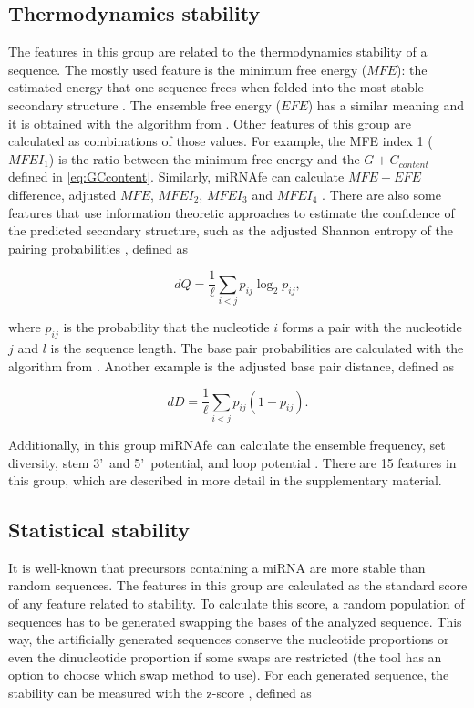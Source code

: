 \documentclass{article}
\begin{document}
\subsection{Thermodynamics stability}
The features in this group are related to the thermodynamics stability of a sequence. The mostly used feature is the minimum free energy ($MFE$): the estimated 
energy that one sequence frees when folded into the most stable secondary structure \citep{Zuker81}. The ensemble free energy ($EFE$) has a similar meaning and 
it is obtained with the algorithm from \cite{McCaskill90}. Other features of this group are calculated as combinations of those values. For example, the MFE 
index 1 ($MFEI_{1}$) is the ratio between the minimum free energy and the ${G+C}_{content}$ defined in \ref{eq:GCcontent}. Similarly, miRNAfe can calculate 
$MFE-EFE$ difference, adjusted $MFE$, $MFEI_{2}$, $MFEI_{3}$ and $MFEI_{4}$ \citep{Rukshan09}. There are also some features that use information theoretic 
approaches to estimate the confidence of the predicted secondary structure, such as the adjusted Shannon entropy of the pairing probabilities \citep{Ng07}, 
defined as

\begin{equation}
\label{eq:dQ}
 dQ = \frac{1}{\ell} \sum_{i<j} p_{ij} \log_2 p_{ij} ,
\end{equation}

\noindent where $p_{ij}$ is the probability that the nucleotide $i$ forms a pair with the nucleotide $j$ and $l$ is the sequence length. The base pair 
probabilities are calculated with the algorithm from \cite{McCaskill90}. Another example is the adjusted base pair distance, defined as

\begin{equation}
\label{eq:dD}
 dD = \frac{1}{\ell} \sum_{i<j} p_{ij} (1 - p_{ij}).
\end{equation}

Additionally, in this group miRNAfe can calculate the ensemble frequency, set diversity, stem 3\textquoteright~and 5\textquoteright~potential, and loop 
potential \citep{Terai07}. There are 15 features in this group, which are described in more detail in the supplementary material.

\subsection{Statistical stability}
It is well-known that precursors containing a miRNA are more stable than random sequences. The features in this group are calculated as the standard score of 
any feature related to stability. To calculate this score, a random population of sequences has to be generated swapping the bases of the analyzed sequence. 
This way, the artificially generated sequences conserve the nucleotide proportions or even the dinucleotide proportion if some swaps are restricted (the tool 
has an option to choose which swap method to use). For each generated sequence, the stability can be measured with the z-score \citep{Bonnet04}, defined as
\end{document}
